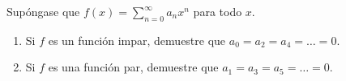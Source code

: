 \item Supóngase que $f(x) = \displaystyle\sum_{n=0}^\infty a_n x^n$ para todo $x$.
    \begin{enumerate}
        \item[(a)] Si $f$ es un función impar, demuestre que $a_0 = a_2 = a_4 = \dots = 0$.
        \item[(b)] Si $f$ es una función par, demuestre que $a_1 = a_3 = a_5 = \dots = 0$.
    \end{enumerate}
